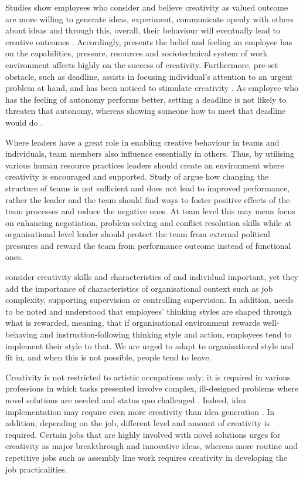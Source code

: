 Studies show employees who consider and believe creativity as valued outcome are more willing to generate ideas, experiment, communicate openly with others about ideas and through this, overall, their behaviour will eventually lead to creative outcomes \citep{shalley2004leaders}. Accordingly, \citet{csikszentmihalyi199916} presents the belief and feeling an employee has on the capabilities, pressure, resources and sociotechnical system of work environment affects highly on the success of creativity. Furthermore, pre-set obstacle, such as deadline, assists in focusing individual's attention to an urgent problem at hand, and has been noticed to stimulate creativity \citep{andriopoulos2000enhancing}. As employee who has the feeling of autonomy performs better, setting a deadline is not likely to threaten that autonomy, whereas showing someone how to meet that deadline would do \citep{mumford2002leading}.

Where leaders have a great role in enabling creative behaviour in teams and individuals, team members also influence essentially in others. Thus, by utilising various human resource practices leaders should create an environment where creativity is encouraged and supported. \citep{shalley2004leaders} Study of \citet{ancona1992demography} argue how changing the structure of teams is not sufficient and does not lead to improved performance, rather the leader and the team should find ways to foster positive effects of the team processes and reduce the negative ones. At team level this may mean focus on enhancing negotiation, problem-solving and conflict resolution skills while at organisational level leader should protect the team from external political pressures and reward the team from performance outcome instead of functional ones. \citep{ancona1992demography}

\citet{oldham1996employee} consider creativity skills and characteristics of and individual important, yet they add the importance of characteristics of organisational context such as job complexity, supporting supervision or controlling supervision. In addition, needs to be noted and understood that employees' thinking styles are shaped through what is rewarded, meaning, that if organisational environment rewards well-behaving and instruction-following thinking style and action, employees tend to implement their style to that. We are urged to adapt to organisational style and fit in, and when this is not possible, people tend to leave. \citep{sternberg1997creativity}

Creativity is not restricted to artistic occupations only; it is required in various professions in which tasks presented involve complex, ill-designed problems where novel solutions are needed and status quo challenged \citep{mumford1988creativity}. Indeed, idea implementation may require even more creativity than idea generation \citep{mumford2002leading}. In addition, depending on the job, different level and amount of creativity is required. Certain jobs that are highly involved with novel solutions urges for creativity as major breakthrough and innovative ideas, whereas more routine and repetitive jobs such as assembly line work requires creativity in developing the job practicalities. \citep{shalley2004leaders} 

